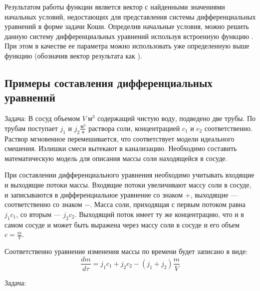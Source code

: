 Результатом работы функции  является вектор с найденными значениями начальных условий, недостающих для представления системы дифференциальных уравнений в форме задачи Коши. Определив начальные условия, можно решить данную систему дифференциальных уравнений используя встроенную функцию .  При этом  в качестве  ее параметра  можно использовать уже определенную выше функцию  (обозначив вектор результата как ).

 \subsection*{Примеры составления дифференциальных уравнений}
 Задача: В сосуд объемом $V\ м^3$ содержащий чистую воду, подведено две трубы. По трубам поступает $j_1$ и $j_2 \frac{м^3}{ч}$ раствора соли, концентрацией $c_1$ и $c_2$ соответственно. Раствор мгновенное перемешивается, что соответствует модели идеального смешения. Излишки смеси вытекают в канализацию. Необходимо составить математическую модель для описания массы соли находящейся в сосуде.
 
 При составлении дифференциального уравнения необходимо учитывать входящие и выходящие потоки массы. Входящие потоки увеличивают массу соли в сосуде, и записываются в дифференциальное уравнение со знаком +, выходящие --- соответственно со знаком $-$. Масса соли, приходящая с первым потоком равна $j_1 c_1$, со вторым --- $j_2 c_2$. Выходящий поток имеет ту же концентрацию, что и в самом сосуде и может быть выражена через массу соли в сосуде и его объем $c=\frac{m}{V}$.
 
 Соответственно уравнение изменения массы по времени будет записано в виде:
 \begin{equation}
 	\dfrac{d m}{d \tau} = j_1 c_1 + j_2 c_2 - (j_1 + j_2 ) \dfrac{m}{V}
 \end{equation}
 
 Задача: 
 